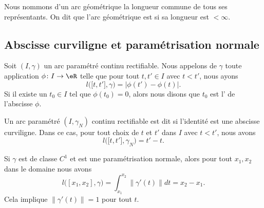 \begin{definition}
    Nous nommons  d'un arc géométrique la longueur commune de tous ses représentants. On dit que l'arc géométrique est  si sa longueur est $<\infty$.
\end{definition}

\subsection{Abscisse curviligne et paramétrisation normale}     \label{SubSecAbsCurv}

\begin{definition}
Soit $(I,\gamma)$ un arc paramétré continu rectifiable. Nous appelons  de $\gamma$ toute application $\phi\colon I\to \eR$ telle que pour tout $t,t'\in I$ avec $t<t'$, nous ayons
\begin{equation}
    l\big( \mathopen[ t,t'  \mathclose],\gamma\big) = \big|  \phi(t')-\phi(t) \big|.
\end{equation}
Si il existe un $t_0\in I$ tel que $\phi(t_0)=0$, alors nous disons que $t_0$ est l' de l'abscisse $\phi$.

Un arc paramétré $(I,\gamma_N)$ continu rectifiable est dit  si l'identité est une abscisse curviligne. Dans ce cas, pour tout choix de $t$ et $t'$ dans $I$ avec $t<t'$, nous avons 
\begin{equation}
    l\big( \mathopen[ t , t' \mathclose],\gamma_N \big)=t'-t.
\end{equation}
\end{definition}

%
%

\begin{normaltext}
    Si \( \gamma\) est de classe \( C^1\) et est une paramétrisation normale, alors pour tout \( x_1,x_2\) dans le domaine nous avons
    \begin{equation}
        l\big( [x_1,x_2],\gamma \big)=\int_{x_1}^{x_2}\| \gamma'(t) \|dt=x_2-x_1.
    \end{equation}
    Cela implique \( \| \gamma'(t) \|=1\) pour tout \( t\).
\end{normaltext}

